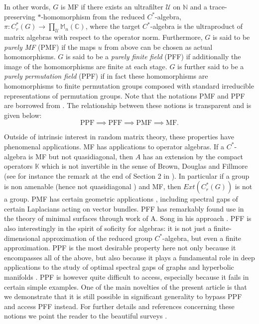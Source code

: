 \documentclass[10pt]{amsart}
\theoremstyle{definition}
\newcommand{\C}{\ensuremath{\mathbb{C}}}
\newcommand{\M}{\ensuremath{\mathbb{M}}}
\newcommand{\N}{\ensuremath{\mathbb{N}}}
\newcommand{\cU}{\ensuremath{\mathcal{U}}}
\begin{document}
 In other words, $G$ is MF if there exists an ultrafilter $\cU$ on $\N$ and a trace-preserving $*$-homomorphism from the reduced $C^*$-algebra, $\pi: C^*_r(G)\to \prod_\cU \M_n(\C)$, where the target $C^*$-algebra is the ultraproduct of matrix algebras with respect to the operator norm. Furthermore, $G$ is said to be \emph{purely MF} (PMF) if the maps $u$ from above can be chosen as actual homomorphisms. $G$ is said to be a \emph{purely finite field} (PFF) if additionally the image of the homomorphisms are finite at each stage. $G$ is further said to be a \emph{purely permutation field} (PPF) if in fact these homomorphisms are homomorphisms to finite permutation groups composed with standard irreducible representations of permutation groups. Note that the notations PMF and PPF are  borrowed from \cite{magee2025strong}. The relationship between these notions is transparent and is given below: 
$$\text{PPF} \implies \text{PFF} \implies \text{PMF}\implies  \text{MF}.$$

Outside of intrinsic interest in random matrix theory, these properties have phenomenal applications. MF has applications to operator algebras. If a $C^*$-algebra is MF but not quasidiagonal, then
$A$ has an extension by the compact operators $\mathbb{K}$ which is not invertible in the sense of Brown, Douglas and Fillmore \cite{BrownDouglasFillmore1977} (see for instance the remark at the end of Section 2 in \cite{Seebach2012}). In particular if a group is non amenable (hence not quasidiagonal \cite{Hadwin1987}) and MF, then $Ext(C^*_r(G))$ is not a group. PMF has certain geometric applications \cite{MageeThomas2023}, including spectral gaps of certain  
Laplacians acting on vector bundles. PFF has remarkably found use in the theory of minimal surfaces through work of A. Song in his approach \cite{song2025randomharmonicmapsspheres}. PFF is also interestingly in the spirit of soficity \cite{pestov2008hyperlinear} for algebras: it is not just a
finite-dimensional approximation of the reduced group $C^*$-algebra, but
even a finite approximation. PPF is the most desirable property here not only because it encompasses all of the above, but also because it plays a fundamental role in deep applications to the study of optimal spectral gaps of graphs and hyperbolic manifolds \cite{BordenaveCollins2019, HideMagee2023}. PPF is however quite difficult to access, especially because it fails in certain simple examples. One of the main novelties of the present article is that we demonstrate that it is still possible in significant generality to bypass PPF and access PFF instead. For further details and references concerning these notions we point the reader to the beautiful surveys \cite{magee2025strong, vanhandel2025strongconvergenceshortsurvey}.
\end{document}
